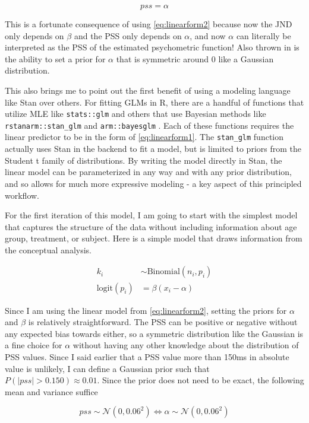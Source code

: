 \documentclass[11pt, oneside, openany]{scrbook}
\begin{document}
\[
pss = \alpha
\]

This is a fortunate consequence of using \eqref{eq:linearform2} because now the JND only depends on \(\beta\) and the PSS only depends on \(\alpha\), and now \(\alpha\) can literally be interpreted as the PSS of the estimated psychometric function! Also thrown in is the ability to set a prior for \(\alpha\) that is symmetric around \(0\) like a Gaussian distribution.

This also brings me to point out the first benefit of using a modeling language like Stan over others. For fitting GLMs in R, there are a handful of functions that utilize MLE like \texttt{stats::glm} and others that use Bayesian methods like \texttt{rstanarm::stan\_glm} and \texttt{arm::bayesglm} \citep{R-rstanarm, R-arm}. Each of these functions requires the linear predictor to be in the form of \eqref{eq:linearform1}. The \texttt{stan\_glm} function actually uses Stan in the backend to fit a model, but is limited to priors from the Student t family of distributions. By writing the model directly in Stan, the linear model can be parameterized in any way and with any prior distribution, and so allows for much more expressive modeling - a key aspect of this principled workflow.

For the first iteration of this model, I am going to start with the simplest model that captures the structure of the data without including information about age group, treatment, or subject. Here is a simple model that draws information from the conceptual analysis.

\begin{align*}
  k_i &\sim \mathrm{Binomial}(n_i, p_i) \\
  \mathrm{logit}(p_i) &= \beta ( x_i - \alpha )
\end{align*}

Since I am using the linear model from \eqref{eq:linearform2}, setting the priors for \(\alpha\) and \(\beta\) is relatively straightforward. The PSS can be positive or negative without any expected bias towards either, so a symmetric distribution like the Gaussian is a fine choice for \(\alpha\) without having any other knowledge about the distribution of PSS values. Since I said earlier that a PSS value more than 150ms in absolute value is unlikely, I can define a Gaussian prior such that \(P(|pss| > 0.150) \approx 0.01\). Since the prior does not need to be exact, the following mean and variance suffice

\[
pss \sim \mathcal{N}(0, 0.06^2) \Longleftrightarrow \alpha \sim \mathcal{N}(0, 0.06^2)
\]
\end{document}
